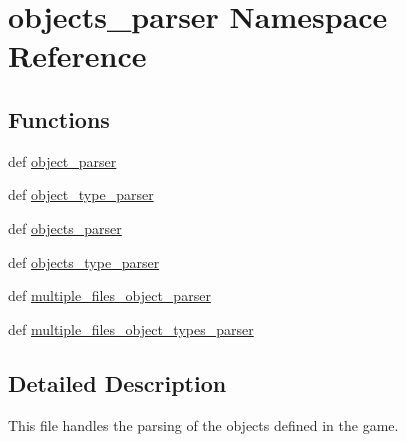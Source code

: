 \hypertarget{namespaceobjects__parser}{\section{objects\-\_\-parser \-Namespace \-Reference}
\label{namespaceobjects__parser}
}
\subsection*{\-Functions}
\begin{DoxyCompactItemize}
\item 
def \hyperlink{namespaceobjects__parser_a644e22cf69be4f9c4d5bdb5391f88704}{object\-\_\-parser}
\item 
def \hyperlink{namespaceobjects__parser_a6db34fdb8d9758d93aebe6d00d83912f}{object\-\_\-type\-\_\-parser}
\item 
def \hyperlink{namespaceobjects__parser_a870c0633694e049ba3cf799697977609}{objects\-\_\-parser}
\item 
def \hyperlink{namespaceobjects__parser_afc8321917c69d971487a5bec30698f6f}{objects\-\_\-type\-\_\-parser}
\item 
def \hyperlink{namespaceobjects__parser_a141baa02fef1e5ae1c4d34dc2cca80e5}{multiple\-\_\-files\-\_\-object\-\_\-parser}
\item 
def \hyperlink{namespaceobjects__parser_ae706c42c31e62619ac737ad174a58fe7}{multiple\-\_\-files\-\_\-object\-\_\-types\-\_\-parser}
\end{DoxyCompactItemize}


\subsection{\-Detailed \-Description}
\begin{DoxyVerb}
This file handles the parsing of the objects defined in the game.
\end{DoxyVerb}
 

